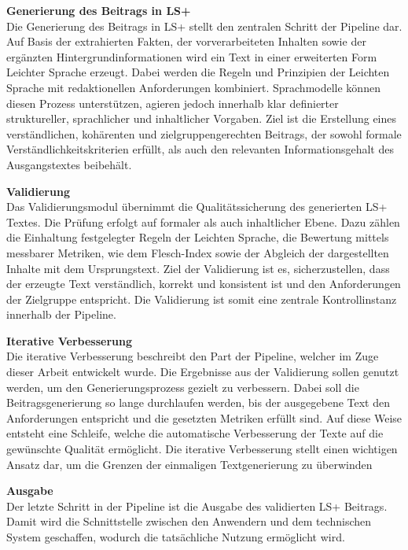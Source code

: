 \textbf{Generierung des Beitrags in LS+}\\
Die Generierung des Beitrags in LS+ stellt den zentralen Schritt der Pipeline dar.
Auf Basis der extrahierten Fakten, der vorverarbeiteten Inhalten sowie der ergänzten Hintergrundinformationen wird ein Text in einer erweiterten Form Leichter Sprache erzeugt.
Dabei werden die Regeln und Prinzipien der Leichten Sprache mit redaktionellen Anforderungen kombiniert.
Sprachmodelle können diesen Prozess unterstützen, agieren jedoch innerhalb klar definierter struktureller, sprachlicher und inhaltlicher Vorgaben.
Ziel ist die Erstellung eines verständlichen, kohärenten und zielgruppengerechten Beitrags, der sowohl formale Verständlichkeitskriterien erfüllt, als auch den relevanten Informationsgehalt des Ausgangstextes beibehält.

\textbf{Validierung}\\
Das Validierungsmodul übernimmt die Qualitätssicherung des generierten LS+ Textes.
Die Prüfung erfolgt auf formaler als auch inhaltlicher Ebene.
Dazu zählen die Einhaltung festgelegter Regeln der Leichten Sprache, die Bewertung mittels messbarer Metriken, wie dem Flesch-Index sowie der Abgleich der dargestellten Inhalte mit dem Ursprungstext.
Ziel der Validierung ist es, sicherzustellen, dass der erzeugte Text verständlich, korrekt und konsistent ist und den Anforderungen der Zielgruppe entspricht.
Die Validierung ist somit eine zentrale Kontrollinstanz innerhalb der Pipeline.

\textbf{Iterative Verbesserung}\\
Die iterative Verbesserung beschreibt den Part der Pipeline, welcher im Zuge dieser Arbeit entwickelt wurde.
Die Ergebnisse aus der Validierung sollen genutzt werden, um den Generierungsprozess gezielt zu verbessern.
Dabei soll die Beitragsgenerierung so lange durchlaufen werden, bis der ausgegebene Text den Anforderungen entspricht und die gesetzten Metriken erfüllt sind.
Auf diese Weise entsteht eine Schleife, welche die automatische Verbesserung der Texte auf die gewünschte Qualität ermöglicht.
Die iterative Verbesserung stellt einen wichtigen Ansatz dar, um die Grenzen der einmaligen Textgenerierung zu überwinden

\textbf{Ausgabe}\\
Der letzte Schritt in der Pipeline ist die Ausgabe des validierten LS+ Beitrags.
Damit wird die Schnittstelle zwischen den Anwendern und dem technischen System geschaffen, wodurch die tatsächliche Nutzung ermöglicht wird.